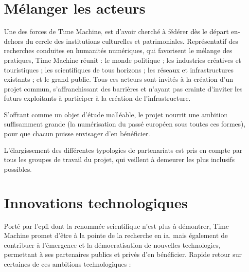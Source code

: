 \section {Mélanger les acteurs}

Une des forces de Time Machine, est d'avoir cherché à fédérer dès le départ en-dehors du cercle des institutions culturelles et patrimoniales. Représentatif des recherches conduites en humanités numériques, qui favorisent le mélange des pratiques, Time Machine réunit : le monde politique ; les industries créatives et touristiques ; les scientifiques de tous horizons ;  les réseaux et infrastructures existants ;  et le grand public. Tous ces acteurs sont invités à la création d'un projet commun, s'affranchissant des barrières et n'ayant pas crainte d'inviter les futurs exploitants à participer à la création de l'infrastructure.

S'offrant comme un objet d'étude malléable, le projet nourrit une ambition suffisamment grande (la numérisation du passé européen sous toutes ces formes), pour que chacun puisse envisager d'en bénéficier. 

L'élargissement des différentes typologies de partenariats est pris en compte par tous les groupes de travail du projet, qui veillent à demeurer les plus inclusifs possibles.


\section {Innovations technologiques }

Porté par l'\gls{epfl} dont la renommée scientifique n'est plus à démontrer, Time Machine promet d'être à la pointe de la recherche en \gls{ia}, mais également de contribuer à l'émergence et la démocratisation de nouvelles technologies, permettant à ses partenaires publics et privés d'en bénéficier. Rapide retour sur certaines de ces ambitions technologiques :

